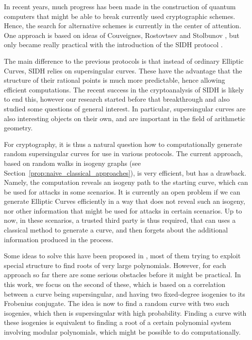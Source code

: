 
In recent years, much progress has been made in the construction of quantum computers that might be able to break currently used cryptographic schemes.
Hence, the search for alternative schemes is currently in the center of attention.
One approach is based on ideas of Couveignes, Rostovtsev and Stolbunov \cite{old_isogeny_crypto1, old_isogeny_crypto2, old_isogeny_crypto3}, but only became really practical with the introduction of the SIDH protocol \cite{sidh}.

The main difference to the previous protocols is that instead of ordinary Elliptic Curves, SIDH relies on supersingular curves.
These have the advantage that the structure of their rational points is much more predictable, hence allowing efficient computations.
The recent success in the cryptoanalysis of SIDH \cite{sidh_broken} is likely to end this, however our research started before that breakthrough and also studied some questions of general interest.
In particular, supersingular curves are also interesting objects on their own, and are important in the field of arithmetic geometry.

For cryptography, it is thus a natural question how to computationally generate random supersingular curves for use in various protocols.
The current approach, based on random walks in isogeny graphs (see Section~\ref{prop:naive_classical_approaches}), is very efficient, but has a drawback.
Namely, the computation reveals an isogeny path to the starting curve, which can be used for attacks in some scenarios.
It is currently an open problem if we can generate Elliptic Curves efficiently in a way that does not reveal such an isogeny, nor other information that might be used for attacks in certain scenarios.
Up to now, in these scenarios, a trusted third party is thus required, that can uses a classical method to generate a curve, and then forgets about the additional information produced in the process.

Some ideas to solve this have been proposed in \cite{base_paper}, most of them trying to exploit special structure to find roots of very large polynomials.
However, for each approach so far there are some serious obstacles before it might be practical.
In this work, we focus on the second of these, which is based on a correlation between a curve being supersingular, and having two fixed-degree isogenies to its Frobenius conjugate.
The idea is now to find a random curve with two such isogenies, which then is supersingular with high probability.
Finding a curve with these isogenies is equivalent to finding a root of a certain polynomial system involving modular polynomials, which might be possible to do computationally.

